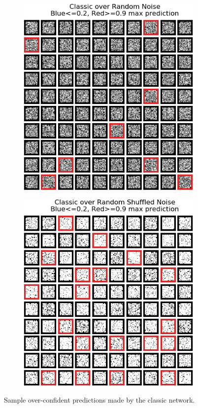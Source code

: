 \documentclass[12pt,oneside]{CUNY_PhD}
\begin{document}
\begin{figure}[!h]
    \centering
    \begin{subfigure}[t]{0.48\textwidth}
        \includegraphics[width=\textwidth]{images/mnist-behavior/classic-pred-random.png}
    \end{subfigure}
    \begin{subfigure}[t]{0.48\textwidth}
        \includegraphics[width=\textwidth]{images/mnist-behavior/classic-pred-shuffled.png}
    \end{subfigure}
    \caption{Sample over-confident predictions made by the classic network.}
    \label{fig:classic-preds}
\end{figure}
\end{document}
